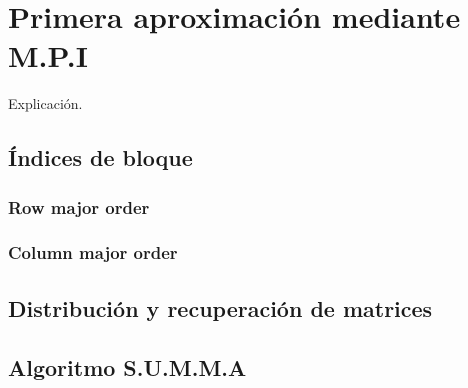 
\chapter{Primera aproximación mediante M.P.I\label{chapPrimeraAproximacionMpi}}

Explicación.


\section{Índices de bloque}
\subsection{Row major order}
\subsection{Column major order}
\section{Distribución y recuperación de matrices}
\section{Algoritmo S.U.M.M.A}
\newpage
